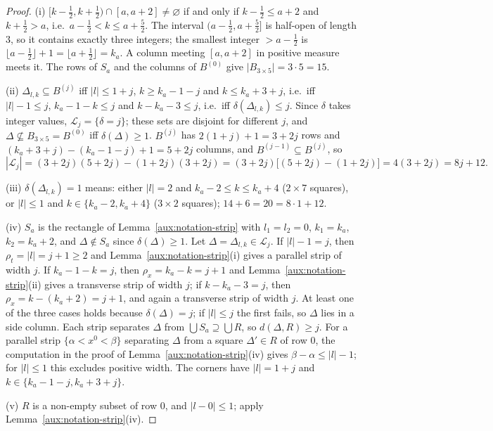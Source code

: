 \begin{proof}
(i) $[k-\frac12,k+\frac12)\cap[a,a+2]\ne\varnothing$ if and only if $k-\frac12\le a+2$ and
$k+\frac12>a$, i.e.\ $a-\frac12<k\le a+\frac52$.  The interval $(a-\frac12,a+\frac52]$ is
half-open of length $3$, so it contains exactly three integers; the smallest integer
$>a-\frac12$ is $\lfloor a-\frac12\rfloor+1=\lfloor a+\frac12\rfloor=k_a$.  A column meeting
$[a,a+2]$ in positive measure meets it.  The rows of $S_a$ and the columns of $B^{(0)}$ give
$|B_{3\times5}|=3\cdot5=15$.

(ii) $\Delta_{l,k}\subseteq B^{(j)}$ iff $|l|\le1+j$, $k\ge k_a-1-j$ and $k\le k_a+3+j$, i.e.\
iff $|l|-1\le j$, $k_a-1-k\le j$ and $k-k_a-3\le j$, i.e.\ iff $\delta(\Delta_{l,k})\le j$.
Since $\delta$ takes integer values, $\mathcal L_j=\{\delta=j\}$; these sets are disjoint
for different $j$, and $\Delta\not\subseteq B_{3\times5}=B^{(0)}$ iff $\delta(\Delta)\ge1$.
$B^{(j)}$ has $2(1+j)+1=3+2j$ rows and $(k_a+3+j)-(k_a-1-j)+1=5+2j$ columns, and
$B^{(j-1)}\subseteq B^{(j)}$, so
\[
 |\mathcal L_j|=(3+2j)(5+2j)-(1+2j)(3+2j)=(3+2j)\bigl[(5+2j)-(1+2j)\bigr]=4(3+2j)=8j+12 .
\]

(iii) $\delta(\Delta_{l,k})=1$ means: either $|l|=2$ and $k_a-2\le k\le k_a+4$ ($2\times7$
squares), or $|l|\le1$ and $k\in\{k_a-2,k_a+4\}$ ($3\times2$ squares); $14+6=20=8\cdot1+12$.

(iv) $S_a$ is the rectangle of Lemma~\ref{aux:notation-strip} with $l_1=l_2=0$, $k_1=k_a$,
$k_2=k_a+2$, and $\Delta\notin S_a$ since $\delta(\Delta)\ge1$.  Let $\Delta=\Delta_{l,k}\in
\mathcal L_j$.  If $|l|-1=j$, then $\rho_t=|l|=j+1\ge2$ and Lemma~\ref{aux:notation-strip}(i)
gives a parallel strip of width $j$.  If $k_a-1-k=j$, then $\rho_x=k_a-k=j+1$ and
Lemma~\ref{aux:notation-strip}(ii) gives a transverse strip of width $j$; if $k-k_a-3=j$, then
$\rho_x=k-(k_a+2)=j+1$, and again a transverse strip of width $j$.  At least one of the three
cases holds because $\delta(\Delta)=j$; if $|l|\le j$ the first fails, so $\Delta$ lies in a
side column.  Each strip separates $\Delta$ from $\bigcup S_a\supseteq\bigcup R$, so
$d(\Delta,R)\ge j$.  For a parallel strip $\{\alpha<x^0<\beta\}$ separating $\Delta$ from a
square $\Delta'\in R$ of row $0$, the computation in the proof of
Lemma~\ref{aux:notation-strip}(iv) gives $\beta-\alpha\le|l|-1$; for $|l|\le1$ this excludes
positive width.  The corners have $|l|=1+j$ and $k\in\{k_a-1-j,k_a+3+j\}$.

(v) $R$ is a non-empty subset of row $0$, and $|l-0|\le1$; apply
Lemma~\ref{aux:notation-strip}(iv).


\end{proof}
